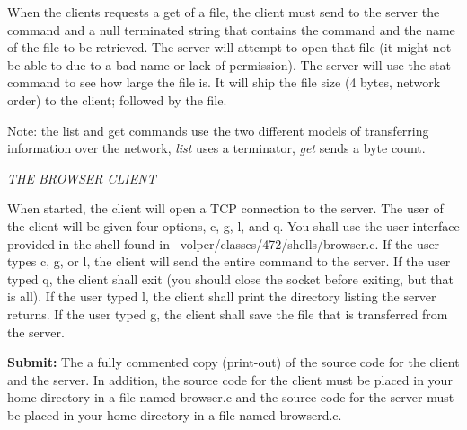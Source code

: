 
When the clients requests a get of a file,
the client must send to the server the command and a null terminated
string that contains the command and the name of the file to be
retrieved. 
The server will attempt to open that file (it might not be able
to due to a bad name or lack of permission).
The server will use the {\ltt{}stat} command to see how large the
file is.
It will ship the file size (4 bytes, network order) to the client;
followed by the file.

Note: the list and get commands use the two different models
of transferring information over the network,
{\it list} uses a terminator,
{\it get} sends a byte count.

{\it THE BROWSER CLIENT}

When started, the client will open a TCP connection to the server.
The user of the client will be given four options,
{\ltt{}c}, {\ltt{}g}, {\ltt{}l}, and {\ltt{}q}.
You shall use the user interface provided in the shell found in
\hfill\break
{\ltt{}~volper/classes/472/shells/browser.c}.
If the user types {\ltt{}c}, {\ltt{}g}, or {\ltt{}l}, the client will
send the entire command to the server.
If the user typed {\ltt{}q}, the client shall exit
(you should close the socket before exiting, but that is all).
If the user typed {\ltt{}l}, the client shall
print the directory listing the server returns.
If the user typed {\ltt{}g}, the client shall
save the file that is transferred from the server.


{\bf Submit:} The a fully commented copy (print-out) of the source code for the 
client and the server.
In addition,
the source code for the client must be placed in your home directory
in a file named {\ltt{}browser.c} and
the source code for the server must be placed in your home directory
in a file named {\ltt{}browserd.c}.

